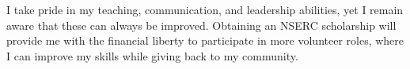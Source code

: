 \documentclass[letterpaper,12pt]{article}
\begin{document}
I take pride in my teaching, communication, and leadership abilities, yet I
remain aware that these can always be improved.
Obtaining an NSERC scholarship will provide me with the financial liberty to
participate in more volunteer roles, where I can improve my skills while giving back to my
community.
\end{document}
